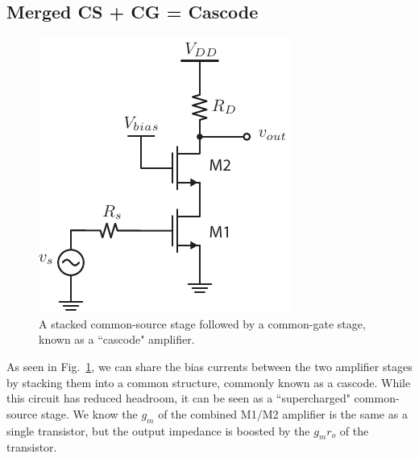 \subsection{Merged CS + CG = Cascode}
\begin{figure}[tb]
\centering
\includegraphics[scale=1]{10cascode_dc}
\caption{A stacked common-source stage followed by a common-gate stage, known as a ``cascode" amplifier.}
\label{fig:10cascode_dc}
\end{figure}
As seen in Fig.~\ref{fig:10cascode_dc}, we can share the bias currents between the two amplifier stages by stacking them into a common structure, commonly known as a cascode.  While this circuit has reduced headroom, it can be seen as a ``supercharged" common-source stage.  We know the $g_m$ of the combined M1/M2 amplifier is the same as a single transistor, but the output impedance is boosted by the $g_m r_o$ of the transistor.
